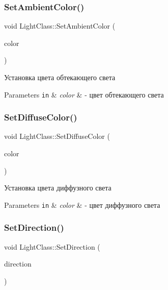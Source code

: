 \subsubsection{\texorpdfstring{Set\+Ambient\+Color()}{SetAmbientColor()}}
{\footnotesize\ttfamily void Light\+Class\+::\+Set\+Ambient\+Color (\begin{DoxyParamCaption}\item[{D3\+D\+X\+V\+E\+C\+T\+O\+R4}]{color }\end{DoxyParamCaption})}



Установка цвета обтекающего света 


\begin{DoxyParams}[1]{Parameters}
\mbox{\tt in}  & {\em color} & -\/ цвет обтекающего света \\
\hline
\end{DoxyParams}
\mbox{\label{class_light_class_ab93e4fabdd76cfa2dd79bd76cdc1f115}} 
\subsubsection{\texorpdfstring{Set\+Diffuse\+Color()}{SetDiffuseColor()}}
{\footnotesize\ttfamily void Light\+Class\+::\+Set\+Diffuse\+Color (\begin{DoxyParamCaption}\item[{D3\+D\+X\+V\+E\+C\+T\+O\+R4}]{color }\end{DoxyParamCaption})}



Установка цвета диффузного света 


\begin{DoxyParams}[1]{Parameters}
\mbox{\tt in}  & {\em color} & -\/ цвет диффузного света \\
\hline
\end{DoxyParams}
\mbox{\label{class_light_class_a4728e2e14ff7afc3fb48a1dd3a68c5f7}} 
\subsubsection{\texorpdfstring{Set\+Direction()}{SetDirection()}}
{\footnotesize\ttfamily void Light\+Class\+::\+Set\+Direction (\begin{DoxyParamCaption}\item[{D3\+D\+X\+V\+E\+C\+T\+O\+R3}]{direction }\end{DoxyParamCaption})}



